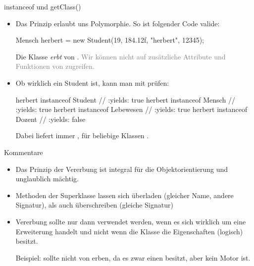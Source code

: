 \begin{frame}[fragile]{instanceof und getClass()}
    \begin{itemize}[<+(1)->]
        \widei
        \item Das Prinzip erlaubt uns Polymorphie.\pause{} So ist folgender Code valide:\pause{}
\begin{plainjava}
Mensch herbert = new Student(19, 184.12f, "herbert", 12345);
\end{plainjava}
        \pause{}Die Klasse  \emph{erbt} von .\pause{} \textcolor{gray}{Wir können nicht auf zusätzliche Attribute und Funktionen von  zugreifen.}
        \item Ob  wirklich ein Student ist,\pause{} kann man mit  prüfen:\pause{}
\begin{plainjava}
herbert instanceof Student // :yields: true
herbert instanceof Mensch // :yields: true
herbert instanceof Lebewesen // :yields: true
herbert instanceof Dozent // :yields: false
\end{plainjava}
        Dabei liefert  immer , für beliebige Klassen .
    \end{itemize}
\end{frame}

\begin{frame}{Kommentare}
    \begin{itemize}[<+(1)->]
        \widei
        \item Das Prinzip der Vererbung ist integral für die Objektorientierung und unglaublich mächtig.
        \item Methoden der Superklasse lassen sich überladen (gleicher Name, andere Signatur),\pause{} als auch überschreiben (gleiche Signatur)
        \item Vererbung sollte nur dann verwendet werden,\pause{} wenn es sich wirklich um eine Erweiterung handelt und nicht wenn die Klasse  die Eigenschaften (logisch) besitzt.\pause{} \medskip\par Beispiel:  sollte nicht von  erben, da es zwar einen besitzt, aber kein Motor ist.
    \end{itemize}
\end{frame}

